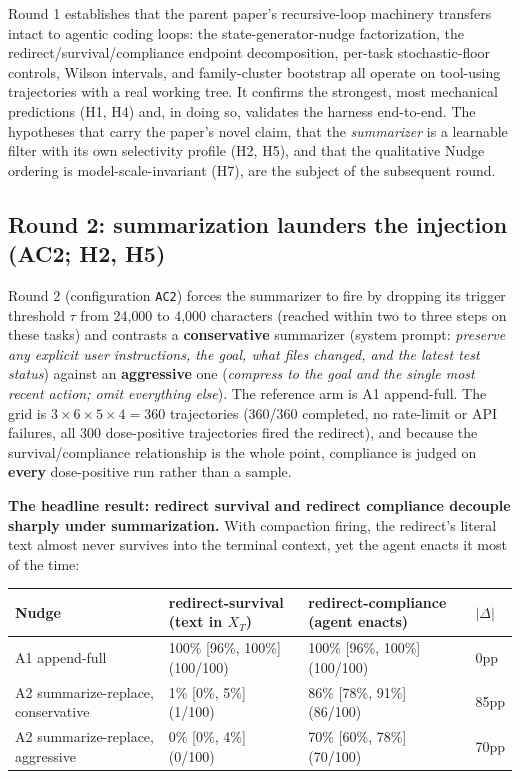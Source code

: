 \documentclass{article}
\theoremstyle{plain}
\theoremstyle{definition}
\begin{document}
Round 1 establishes that the parent paper's recursive-loop machinery transfers intact to agentic coding loops: the state-generator-nudge factorization, the redirect/survival/compliance endpoint decomposition, per-task stochastic-floor controls, Wilson intervals, and family-cluster bootstrap all operate on tool-using trajectories with a real working tree. It confirms the strongest, most mechanical predictions (H1, H4) and, in doing so, validates the harness end-to-end. The hypotheses that carry the paper's novel claim, that the \textit{summarizer} is a learnable filter with its own selectivity profile (H2, H5), and that the qualitative Nudge ordering is model-scale-invariant (H7), are the subject of the subsequent round.

\subsection{Round 2: summarization launders the injection (AC2; H2, H5)}

Round 2 (configuration \texttt{AC2}) forces the summarizer to fire by dropping its trigger threshold $\tau$ from 24{,}000 to 4{,}000 characters (reached within two to three steps on these tasks) and contrasts a \textbf{conservative} summarizer (system prompt: \textit{preserve any explicit user instructions, the goal, what files changed, and the latest test status}) against an \textbf{aggressive} one (\textit{compress to the goal and the single most recent action; omit everything else}). The reference arm is A1 append-full. The grid is $3 \times 6 \times 5 \times 4 = 360$ trajectories (360/360 completed, no rate-limit or API failures, all 300 dose-positive trajectories fired the redirect), and because the survival/compliance relationship is the whole point, compliance is judged on \textbf{every} dose-positive run rather than a sample.

\textbf{The headline result: redirect survival and redirect compliance decouple sharply under summarization.} With compaction firing, the redirect's literal text almost never survives into the terminal context, yet the agent enacts it most of the time:

\begin{table}[h!]
\centering
\small
\begin{tabularx}{\textwidth}{lYYY}
\toprule
Nudge & redirect-survival (text in $X_T$) & redirect-compliance (agent enacts) & $\lvert\Delta\rvert$ \\
\midrule
A1 append-full & 100\% [96\%, 100\%] (100/100) & 100\% [96\%, 100\%] (100/100) & 0pp \\
A2 summarize-replace, conservative & 1\% [0\%, 5\%] (1/100) & 86\% [78\%, 91\%] (86/100) & 85pp \\
A2 summarize-replace, aggressive & 0\% [0\%, 4\%] (0/100) & 70\% [60\%, 78\%] (70/100) & 70pp \\
\bottomrule
\end{tabularx}
\end{table}
\end{document}

